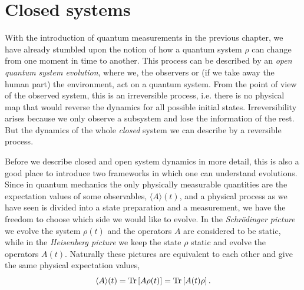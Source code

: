 \section{Closed systems}
With the introduction of quantum measurements in the previous chapter, we have already stumbled upon the notion of how a quantum system $\rho$ can change from one moment in time to another. This process can be described by an \textit{open quantum system evolution}, where we, the observers or (if we take away the human part) the environment, act on a quantum system. From the point of view of the observed system, this is an irreversible process, i.e. there is no physical map that would reverse the dynamics for all possible initial states. Irreversibility arises because we only observe a subsystem and lose the information of the rest. But the dynamics of the whole \textit{closed} system we can describe by a reversible process. 

Before we describe closed and open system dynamics in more detail, this is also a good place to introduce two frameworks in which one can understand evolutions. Since in quantum mechanics the only physically measurable quantities are the expectation values of some observables, $\langle A \rangle (t)$, and a physical process as we have seen is divided into a state preparation and a measurement, we have the freedom to choose which side we would like to evolve. In the \textit{Schrödinger picture} we evolve the system $\rho(t)$ and the operators $A$ are considered to be static, while in the \textit{Heisenberg picture} we keep the state $\rho$ static and evolve the operators $A(t)$. Naturally these pictures are equivalent to each other and give the same physical expectation values,
\begin{equation}
    \label{eq:schrödinger-heis}
    \langle A \rangle (t) = \operatorname{Tr} \left[A \rho(t) \right] = \operatorname{Tr} \left[ A(t) \rho \right].
\end{equation}

